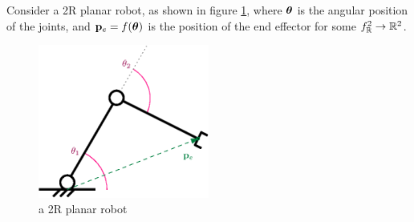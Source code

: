 \documentclass[10pt, letterpaper]{report}
\begin{document}
Consider a 2R planar robot, as shown in figure \ref{img:2R_planar}, where ${\boldsymbol{\theta}}$ is the angular position of the joints, and $\mathbf p_e=f({\boldsymbol{\theta}})$ is the position of the end effector for some $f_{\mathbb R}^2\rightarrow{\mathbb R}^2$.\bigskip

\begin{figure}[h!]
    \centering
    \includegraphics[width=0.5\textwidth ]{images/2R_planar.eps} 
    \caption{a 2R planar robot}
    \label{img:2R_planar}
\end{figure}
\end{document}
